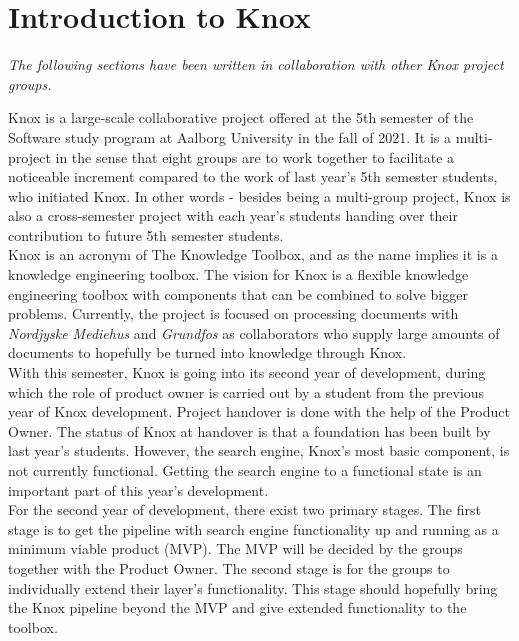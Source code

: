 \chapter{Introduction to Knox}\label{introduction_to_knox}
\textit{The following sections have been written in collaboration with other Knox project groups.}

Knox is a large-scale collaborative project offered at the 5th semester of the Software study program at Aalborg University in the fall of 2021. It is a multi-project in the sense that eight groups are to work together to facilitate a noticeable increment compared to the work of last year's 5th semester students, who initiated Knox. In other words - besides being a multi-group project, Knox is also a cross-semester project with each year's students handing over their contribution to future 5th semester students.\\

Knox is an acronym of The Knowledge Toolbox, and as the name implies it is a knowledge engineering toolbox. The vision for Knox is a flexible knowledge engineering toolbox with components that can be combined to solve bigger problems. Currently, the project is focused on processing documents with \textit{Nordjyske Mediehus} and \textit{Grundfos} as collaborators who supply large amounts of documents to hopefully be turned into knowledge through Knox.\\

With this semester, Knox is going into its second year of development, during which the role of product owner is carried out by a student from the previous year of Knox development. Project handover is done with the help of the Product Owner. The status of Knox at handover is that a foundation has been built by last year's students.
However, the search engine, Knox's most basic component, is not currently functional. Getting the search engine to a functional state is an important part of this year's development.\\

For the second year of development, there exist two primary stages.
The first stage is to get the pipeline with search engine functionality up and running as a minimum viable product (MVP). The MVP will be decided by the groups together with the Product Owner. The second stage is for the groups to individually extend their layer's functionality. This stage should hopefully bring the Knox pipeline beyond the MVP and give extended functionality to the toolbox.\\

